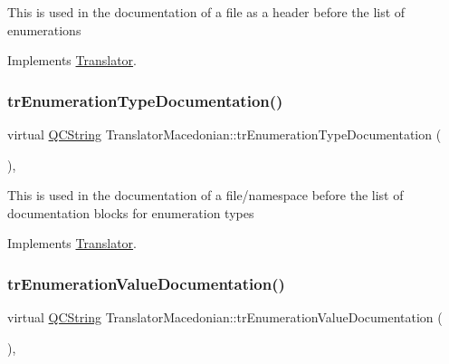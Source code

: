 This is used in the documentation of a file as a header before the list of enumerations 

Implements \mbox{\hyperlink{class_translator}{Translator}}.

\mbox{\label{class_translator_macedonian_a11117cf97412ccf6dbd9b2275f012a14}} 
\subsubsection{\texorpdfstring{trEnumerationTypeDocumentation()}{trEnumerationTypeDocumentation()}}
{\footnotesize\ttfamily virtual \mbox{\hyperlink{class_q_c_string}{Q\+C\+String}} Translator\+Macedonian\+::tr\+Enumeration\+Type\+Documentation (\begin{DoxyParamCaption}{ }\end{DoxyParamCaption})\hspace{0.3cm}{\ttfamily [inline]}, {\ttfamily [virtual]}}

This is used in the documentation of a file/namespace before the list of documentation blocks for enumeration types 

Implements \mbox{\hyperlink{class_translator}{Translator}}.

\mbox{\label{class_translator_macedonian_a196e4698019efb3bdd935f13a6f5b1cb}} 
\subsubsection{\texorpdfstring{trEnumerationValueDocumentation()}{trEnumerationValueDocumentation()}}
{\footnotesize\ttfamily virtual \mbox{\hyperlink{class_q_c_string}{Q\+C\+String}} Translator\+Macedonian\+::tr\+Enumeration\+Value\+Documentation (\begin{DoxyParamCaption}{ }\end{DoxyParamCaption})\hspace{0.3cm}{\ttfamily [inline]}, {\ttfamily [virtual]}}

